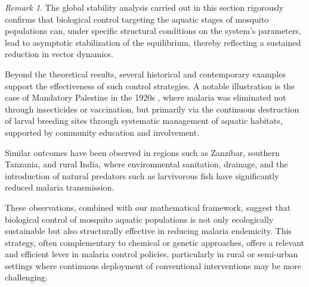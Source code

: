 \documentclass[10pt, a4paper]{amsart}
\theoremstyle{plain}
\theoremstyle{definition}
\theoremstyle{remark}
\newtheorem{remark}[lemma]{Remark}
\numberwithin{equation}{section}
\begin{document}
\begin{remark}
The global stability analysis carried out in this section rigorously confirms that biological control targeting the aquatic stages of mosquito populations can, under specific structural conditions on the system’s parameters, lead to asymptotic stabilization of the equilibrium, thereby reflecting a sustained reduction in vector dynamics.

Beyond the theoretical results, several historical and contemporary examples support the effectiveness of such control strategies. A notable illustration is the case of Mandatory Palestine in the 1920s \cite{ref72}, where malaria was eliminated not through insecticides or vaccination, but primarily via the continuous destruction of larval breeding sites through systematic management of aquatic habitats, supported by community education and involvement.

Similar outcomes have been observed in regions such as Zanzibar, southern Tanzania, and rural India, where environmental sanitation, drainage, and the introduction of natural predators such as larvivorous fish have significantly reduced malaria transmission.

These observations, combined with our mathematical framework, suggest that biological control of mosquito aquatic populations is not only ecologically sustainable but also structurally effective in reducing malaria endemicity. This strategy, often complementary to chemical or genetic approaches, offers a relevant and efficient lever in malaria control policies, particularly in rural or semi-urban settings where continuous deployment of conventional interventions may be more challenging.
\end{remark}
\end{document}
